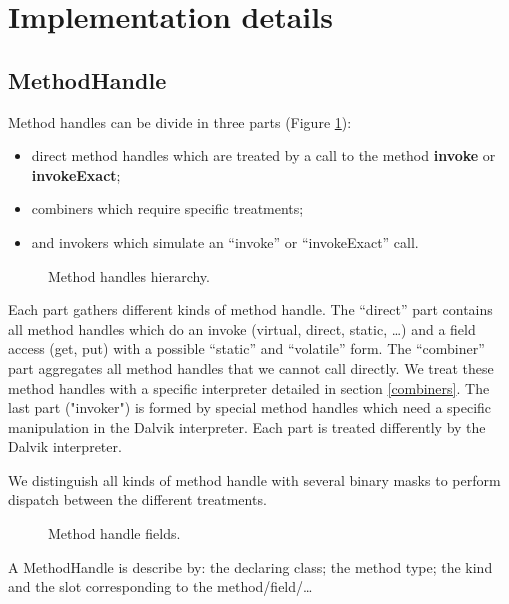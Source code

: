 \documentclass{sig-alternate}
\begin{document}
\section{Implementation details}
\label{implD}

    \subsection{MethodHandle}
      Method handles can be divide in three parts (Figure \ref{mhHier}):
      \begin{itemize}
        \item direct method handles which are treated by a call to the method {\bf invoke} or {\bf invokeExact};
        \item combiners which require specific treatments;
        \item and invokers which simulate an ``invoke'' or ``invokeExact'' call.
      \end{itemize}

      \begin{figure}[!h]
        \centering \resizebox{\linewidth}{!}{}
        \caption{Method handles hierarchy.}
        \label{mhHier}
      \end{figure}

      Each part gathers different kinds of method handle.
      The ``direct'' part contains all method handles which do an invoke (virtual, direct, static, \dots)
      and a field access (get, put) with a possible ``static'' and ``volatile'' form.
      The ``combiner'' part aggregates all method handles that we cannot call directly.
      We treat these method handles with a specific interpreter detailed in section \ref{combiners}.
      The last part ("invoker") is formed by special method handles which need a specific manipulation in the Dalvik interpreter.
      Each part is treated differently by the Dalvik interpreter.

      We distinguish all kinds of method handle with several binary masks to perform dispatch between the different treatments.

      \begin{figure}[!h]
        \centering \vspace{-1.5em}
        \caption{Method handle fields.}
        \label{mhFields}
      \end{figure}

      A MethodHandle is describe by: the declaring class; the method type; the kind and the slot corresponding to the method/field/\dots
\end{document}
